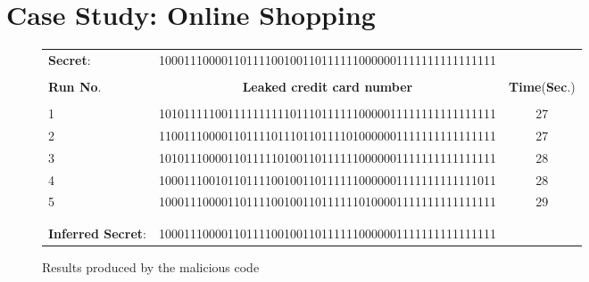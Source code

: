 \documentclass[times, 10pt,twocolumn]{article}
\begin{document}
{\section{Case Study: Online Shopping} \label{sec:online-shopping}
\begin{figure}[t]
{\small
\centering
\begin{tabular}{lcc}
{\bf Secret}: & 100011100001101111001001101111110000001111111111111111
& \\ \\
{\bf Run No}. & {\bf Leaked credit card number} & {\bf Time}({\bf Sec}.) \\ \hline \\
1  & 101011111001111111111011101111110000011111111111111111 & 27 \\
2  & 110011100001101111011101101111010000001111111111111111 & 27 \\
3  & 101011100001101111101001101111110000001111111111111111 & 28 \\
4  & 100011100101101111001001101111110000001111111111111011 & 28 \\
5  & 100011100001101111001001101111110100001111111111111111 & 29 \\
\\ \hline \\
{\bf Inferred Secret}:   & 100011100001101111001001101111110000001111111111111111 & \\
\end{tabular}
\caption{Results produced by the malicious code}
\label{table:leakednumbers}
}
\vspace{-10pt}
\end{figure}


}
\end{document}
